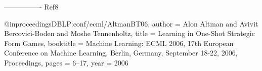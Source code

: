 ----------------
Ref8

@inproceedings{DBLP:conf/ecml/AltmanBT06,
  author    = {Alon Altman and
               Avivit Bercovici{-}Boden and
               Moshe Tennenholtz},
  title     = {Learning in One-Shot Strategic Form Games},
  booktitle = {Machine Learning: {ECML} 2006, 17th European Conference on Machine
               Learning, Berlin, Germany, September 18-22, 2006, Proceedings},
  pages     = {6--17},
  year      = {2006}}












\endinput



